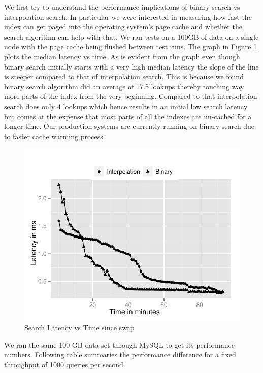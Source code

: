 We first try to understand the performance implications of binary
search vs interpolation search. In particular we were interested in
measuring how fast the index can get paged into the operating system's
page cache and whether the search algorithm can help with that. We ran
tests on a 100GB of data on a single node with the page cache being
flushed between test runs. The graph in Figure \ref{search} plots the
median latency vs time. As is evident from the graph even though
binary search initially starts with a very high median latency the
slope of the line is steeper compared to that of interpolation search.
This is because we found binary search algorithm did an average of
17.5 lookups thereby touching way more parts of the index from the
very beginning. Compared to that interpolation search does only 4
lookups which hence results in an initial low search latency but comes
at the expense that most parts of all the indexes are un-cached for a
longer time. Our production systems are currently running on binary
search due to faster cache warming process.  

\begin{figure}
  \centering
    \includegraphics[scale=0.55]{images/search_1node.pdf}
  \caption{Search Latency vs Time since swap}
  \label{search}
\end{figure}

We ran the same 100 GB data-set through MySQL to get its performance
numbers. Following table summaries the performance difference for a
fixed throughput of 1000 queries per second. 

